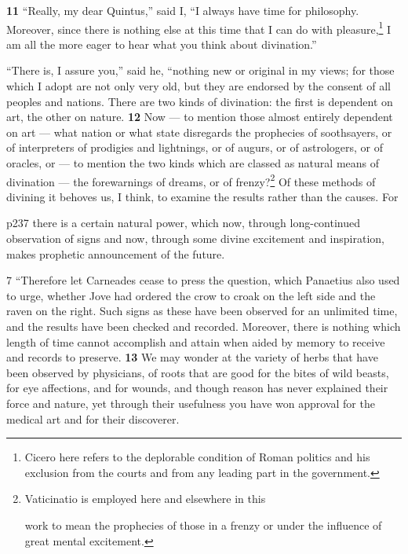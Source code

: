\textbf{11} ``Really, my dear Quintus,'' said I, ``I always have time for philosophy. Moreover, since there is nothing else at this time that I can do with pleasure,\texthebrew{}\footnote{Cicero here refers to the deplorable condition of Roman politics and his exclusion from the courts and from any leading part in the government.

} I am all the more eager to hear what you think about divination.''

``There is, I assure you,'' said he, ``nothing new or original in my views; for those which I adopt are not only very old, but they are endorsed by the consent of all peoples and nations. There are two kinds of divination: the first is dependent on art, the other on nature. \textbf{12} Now \texthebrew{—} to mention those almost entirely dependent on art \texthebrew{—} what nation or what state disregards the prophecies of soothsayers, or of interpreters of prodigies and lightnings, or of augurs, or of astrologers, or of oracles, or \texthebrew{—} to mention the two kinds which are classed as natural means of divination \texthebrew{—} the forewarnings of dreams, or of frenzy?\texthebrew{}\footnote{Vaticinatio is employed here and elsewhere in this

work to mean the prophecies of those in a frenzy or under the influence of great mental excitement.

} Of these methods of divining it behoves us, I think, to examine the results rather than the causes. For

p237 there is a certain natural power, which now, through long-continued observation of signs and now, through some divine excitement and inspiration, makes prophetic announcement of the future.

7
``Therefore let Carneades cease to press the question, which Panaetius also used to urge, whether Jove had ordered the crow to croak on the left side and the raven on the right. Such signs as these have been observed for an unlimited time, and the results have been checked and recorded. Moreover, there is nothing which length of time cannot accomplish and attain when aided by memory to receive and records to preserve. \textbf{13} We may wonder at the variety of herbs that have been observed by physicians, of roots that are good for the bites of wild beasts, for eye affections, and for wounds, and though reason has never explained their force and nature, yet through their usefulness you have won approval for the medical art and for their discoverer.

